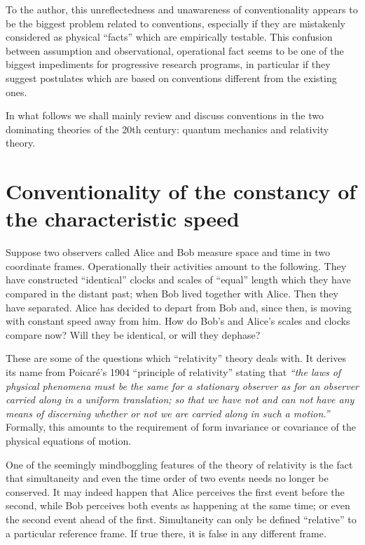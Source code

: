 To the author, this unreflectedness and unawareness of conventionality
appears to be the biggest problem related to conventions,
especially if they are mistakenly considered as physical ``facts''
which are empirically testable.
This confusion between assumption and observational, operational fact
seems to be one of the biggest impediments for progressive research programs,
in particular if they suggest postulates which are based on conventions
different from the existing ones.


In what follows we shall mainly review and discuss conventions in the
two dominating theories of the 20th century: quantum mechanics and
relativity theory.


\section{Conventionality of the constancy of the characteristic speed}

Suppose two observers called Alice and Bob
measure space and time in two
coordinate frames.
Operationally their activities amount to the following.
They have constructed ``identical'' clocks and scales of ``equal''
length
which they have compared in the distant past; when Bob  lived
together with Alice.
Then they have separated.
Alice has decided to depart from Bob and, since then, is moving with
constant speed away from him.
How do Bob's and Alice's scales and clocks compare now?
Will they be identical, or will they dephase?


These are some of the questions which ``relativity'' theory deals with.
It derives its name from Poicar\'e's 1904 ``principle of relativity''
stating that
\cite[p. 74]{miller-1998} {\em ``the laws of physical phenomena must be
the same
for a stationary observer as for an observer carried along in a uniform
translation; so that we have not and can not have any means of
discerning whether or not we are carried along in such a motion.''}
Formally, this amounts to the requirement of form invariance or
covariance of the physical equations of motion.

One of the seemingly mindboggling features of the theory of
relativity is the fact that simultaneity and even the time order of two
events needs no  longer be conserved.
It may indeed happen that Alice perceives the first event before the second,
while Bob perceives both events as happening at the same time; or even
the second event ahead of the first.
Simultaneity can only be defined ``relative'' to a particular reference
frame. If true there, it is false in any different frame.

